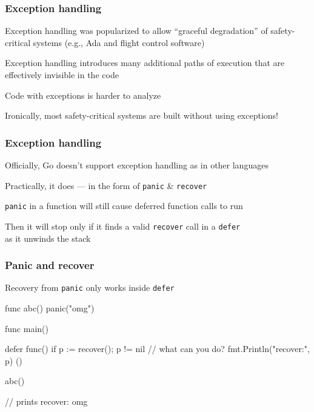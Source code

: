 \documentclass[handout,compress,t,11pt]{beamer}
\begin{document}
\begin{frame}[fragile]
    \frametitle{Exception handling}
    Exception handling was popularized to allow ``graceful degradation'' of
    safety-critical systems (e.g., Ada and flight control software)\par
    \vspace{2\baselineskip}
    Exception handling introduces many additional paths of execution
    that are effectively invisible in the code \par
    \vspace{2\baselineskip}
    Code with exceptions is harder to analyze \par
    \vspace{2\baselineskip}
    Ironically, most safety-critical systems are built without
    using exceptions!
\end{frame}

\begin{frame}[fragile]
    \frametitle{Exception handling}
    Officially, Go doesn't support exception handling as in other languages \par
    \vspace{\baselineskip}
    Practically, it does --- in the form of \verb|panic| \& \verb|recover| \par
    \vspace{\baselineskip}
    \verb|panic| in a function will still cause deferred function calls to run \par
    \vspace{\baselineskip}
    Then it will stop only if it finds a valid \verb|recover| call in a \verb|defer|\\
    as it unwinds the stack \par
\end{frame}

\begin{frame}[fragile]
    \frametitle{Panic and recover}
    Recovery from \verb|panic| only works inside \verb|defer|
\begin{golang}
func abc() {
    panic("omg")
}

func main() {
    defer func() {
        if p := recover(); p != nil {
            // what can you do?
            fmt.Println("recover:", p)
        }
    }()

    abc()
}

// prints recover: omg
\end{golang}
\end{frame}
\end{document}
